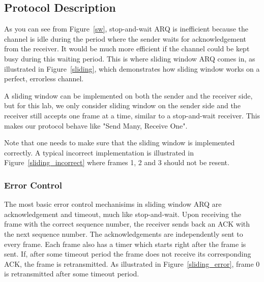 \documentclass[11pt]{article}
\begin{document}
\subsection{Protocol Description}
\label{sec:protocol}
As you can see from Figure~\ref{sw}, stop-and-wait ARQ is inefficient because the channel is idle during the period where the sender waits for acknowledgement from the receiver.
It would be much more efficient if the channel could be kept busy during this waiting period.
This is where sliding window ARQ comes in, as illustrated in Figure~\ref{sliding}, which demonstrates how sliding window works on a perfect, errorless channel.

A sliding window can be implemented on both the sender and the receiver side, but for this lab, we only consider sliding window on the sender side and the receiver still accepts one frame
at a time, similar to a stop-and-wait receiver. This makes our protocol behave like "Send Many, Receive One".

Note that one needs to make sure that the sliding window is implemented correctly.
A typical incorrect implementation is illustrated in Figure~\ref{sliding_incorrect} where frames 1, 2 and 3 should not be resent.


\subsubsection{Error Control}
The most basic error control mechanisims in sliding window ARQ are acknowledgement and timeout, much like stop-and-wait.
Upon receiving the frame with the correct sequence number, the receiver sends back an ACK with the next sequence number.
The acknowledgements are independently sent to every frame.
Each frame also has a timer which starts right after the frame is sent.
If, after some timeout period the frame does not receive its corresponding ACK, the frame is retransmitted.
As illustrated in Figure~\ref{sliding_error}, frame 0 is retransmitted after some timeout period.
\end{document}
